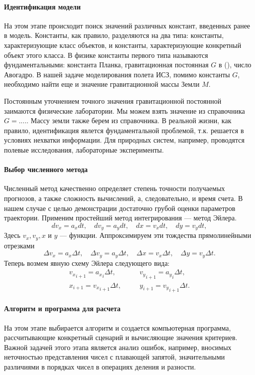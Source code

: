 \documentclass[12pt, openany, twoside]{book} %
\begin{document}
\paragraph{Идентификация модели} На этом этапе происходит поиск значений различных констант, введенных ранее в модель. Константы, как правило, разделяются на два типа: константы, характеризующие класс объектов, и константы, характеризующие конкретный объект этого класса. В физике константы первого типа называются фундаментальными: константа Планка, гравитационная постоянная $G$ в (\cite{newton}), число Авогадро. В нашей задаче моделирования полета ИСЗ, помимо константы $G$, необходимо найти еще и значение гравитационной массы Земли $M$.

Постоянным уточнением точного значения гравитационной постоянной заимаются физические лаборатории. Мы можем взять значение из справочника $G=....$. Массу земли также берем из справочника. В реальной жизни, как правило, идентификация явлется фундаментальной проблемой, т.к. решается в условиях нехватки информации. Для природных систем, например, проводятся полевые исследования, лабораторные эксперименты.

\paragraph{Выбор численного метода} Численный метод качественно определяет степень точности получаемых прогнозов, а также сложность вычислений, а, следовательно, и время счета. В нашем случае с целью демонстрации достаточно грубой оценки параметров траектории. Применим простейший метод интегрирования --- метод Эйлера.
\begin{equation}
dv_x=a_xdt, \quad dv_y=a_ydt, \quad dx=v_xdt, \quad dy=v_ydt,
\nonumber
\end{equation}
Здесь $v_x, v_y, x$ и $y$ --- функции. Аппроксимируем эти тождества прямолинейными отрезками
\begin{equation}
\Delta v_x=a_x\Delta t, \quad \Delta v_y=a_y \Delta t, \quad \Delta x=v_x\Delta t, \quad \Delta y=v_y\Delta t.
\end{equation}
 Теперь возмем явную схему Эйлера следующего вида:
\begin{eqnarray}
{v_x}_{i+1} = {a_x}_i\Delta t, & \quad & {v_y}_{i+1} = {a_y}_i\Delta t, \\
{x}_{i+1} = {v_x}_{i+1}\Delta t, & \quad & {y}_{i+1} = {v_y}_{i+1}\Delta t.
\end{eqnarray}

\paragraph{Алгоритм и программа для расчета} На этом этапе выбирается алгоритм и создается компьютерная программа, рассчитывающие конкретный сценарий и вычисляющие значения критериев. Важной задачей этого этапа является анализ ошибок, например, вносимых неточностью представления чисел с плавающей запятой, значительными различиями в порядках чисел в операциях деления и разности.
\end{document}

